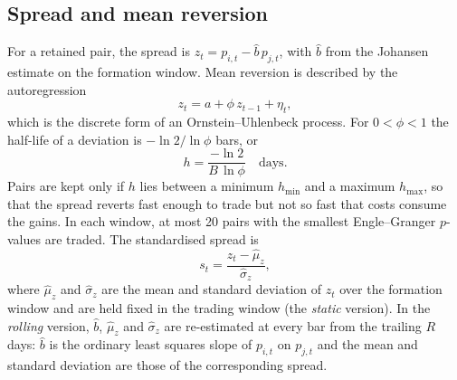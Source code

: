\documentclass[10pt,a4paper,twocolumn]{article}
\begin{document}
	\subsection{Spread and mean reversion}
	\label{sec:spread}
	For a retained pair, the spread is $z_t=p_{i,t}-\hat b\,p_{j,t}$, with $\hat b$ from the Johansen estimate on the formation window. Mean reversion is described by the autoregression
	\begin{equation}
		z_t=a+\phi\,z_{t-1}+\eta_t ,
		\label{eq:ar1}
	\end{equation}
	which is the discrete form of an Ornstein--Uhlenbeck process. For $0<\phi<1$ the half-life of a deviation is $-\ln 2/\ln\phi$ bars, or
	\begin{equation}
		h=\frac{-\ln 2}{B\,\ln\phi}\quad\text{days}.
		\label{eq:hl}
	\end{equation}
	Pairs are kept only if $h$ lies between a minimum $h_{\min}$ and a maximum $h_{\max}$, so that the spread reverts fast enough to trade but not so fast that costs consume the gains. In each window, at most 20 pairs with the smallest Engle--Granger $p$-values are traded. The standardised spread is
	\begin{equation}
		s_t=\frac{z_t-\hat\mu_z}{\hat\sigma_z},
		\label{eq:z}
	\end{equation}
	where $\hat\mu_z$ and $\hat\sigma_z$ are the mean and standard deviation of $z_t$ over the formation window and are held fixed in the trading window (the \emph{static} version). In the \emph{rolling} version, $\hat b$, $\hat\mu_z$ and $\hat\sigma_z$ are re-estimated at every bar from the trailing $R$ days: $\hat b$ is the ordinary least squares slope of $p_{i,t}$ on $p_{j,t}$ and the mean and standard deviation are those of the corresponding spread.
	
\end{document}
